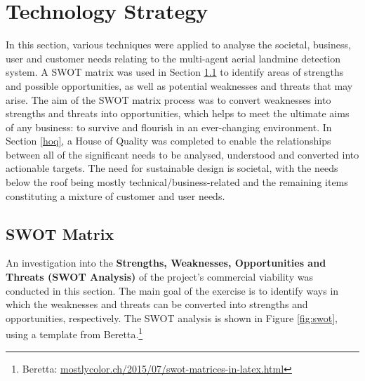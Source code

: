 
\section{Technology Strategy}

In this section, various techniques were applied to analyse the societal, business, user and customer needs relating to the multi-agent aerial landmine detection system. A SWOT matrix was used in Section \ref{sec:swot} to identify areas of strengths and possible opportunities, as well as potential weaknesses and threats that may arise. The aim of the SWOT matrix process was to convert weaknesses into strengths and threats into opportunities, which helps to meet the ultimate aims of any business: to survive and flourish in an ever-changing environment. In Section \ref{hoq}, a House of Quality was completed to enable the relationships between all of the significant needs to be analysed, understood and converted into actionable targets. The need for sustainable design is societal, with the needs below the roof being mostly technical/business-related and the remaining items constituting a mixture of customer and user needs. 


\subsection{SWOT Matrix}
\label{sec:swot}

An investigation into the \textbf{Strengths, Weaknesses, Opportunities and Threats (SWOT Analysis)} of the project's commercial viability was conducted in this section. The main goal of the exercise is to identify ways in which the weaknesses and threats can be converted into strengths and opportunities, respectively. The SWOT analysis is shown in Figure \ref{fig:swot}, using a template from Beretta.\footnote{Beretta: \url{mostlycolor.ch/2015/07/swot-matrices-in-latex.html}}

